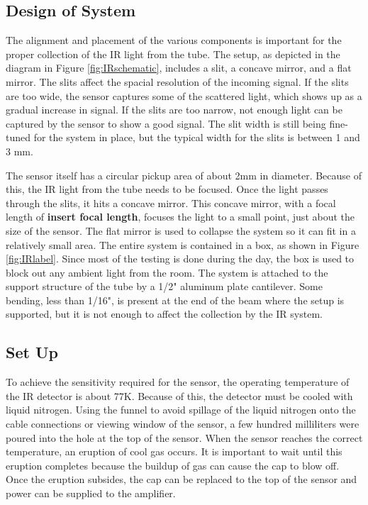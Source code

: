 
\subsection{Design of System}
The alignment and placement of the various components is important for the proper collection of the IR light from the tube. The setup, as depicted in the diagram in Figure \ref{fig:IRschematic}, includes a slit, a concave mirror, and a flat mirror. The slits affect the spacial resolution of the incoming signal. If the slits are too wide, the sensor captures some of the scattered light, which shows up as a gradual increase in signal. If the slits are too narrow, not enough light can be captured by the sensor to show a good signal. The slit width is still being fine-tuned for the system in place, but the typical width for the slits is between 1 and 3 mm. 

The sensor itself has a circular pickup area of about 2mm in diameter. Because of this, the IR light from the tube needs to be focused. Once the light passes through the slits, it hits a concave mirror. This concave mirror, with a focal length of \textbf{insert focal length}, focuses the light to a small point, just about the size of the sensor. The flat mirror is used to collapse the system so it can fit in a relatively small area. The entire system is contained in a box, as shown in Figure \ref{fig:IRlabel}. Since most of the testing is done during the day, the box is used to block out any ambient light from the room. The system is attached to the support structure of the tube by a 1/2" aluminum plate cantilever. Some bending, less than 1/16",  is present at the end of the beam where the setup is supported, but it is not enough to affect the collection by the IR system. 


\subsection{Set Up}


To achieve the sensitivity required for the sensor, the operating temperature of the IR detector is about 77K. Because of this, the detector must be cooled with liquid nitrogen. Using the funnel to avoid spillage of the liquid nitrogen onto the cable connections or viewing window of the sensor, a few hundred milliliters were poured into the hole at the top of the sensor. When the sensor reaches the correct temperature, an eruption of cool gas occurs. It is important to wait until this eruption completes because the buildup of gas can cause the cap to blow off. Once the eruption subsides, the cap can be replaced to the top of the sensor and power can be supplied to the amplifier. 

